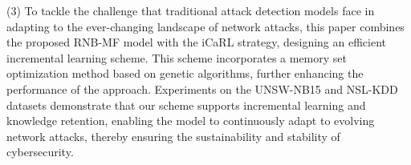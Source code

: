 \begin{eabstract}
  
  (3) To tackle the challenge that traditional attack detection models face in adapting to the ever-changing landscape of network attacks, this paper combines the proposed RNB-MF model with the iCaRL strategy, designing an efficient incremental learning scheme. 
  This scheme incorporates a memory set optimization method based on genetic algorithms, further enhancing the performance of the approach. 
  Experiments on the UNSW-NB15 and NSL-KDD datasets demonstrate that our scheme supports incremental learning and knowledge retention, enabling the model to continuously adapt to evolving network attacks, thereby ensuring the sustainability and stability of cybersecurity.\par

\end{eabstract}

